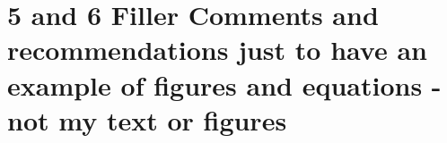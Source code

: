 \section{5 and 6 Filler Comments and recommendations just to have an example of figures and equations - not my text or figures}
